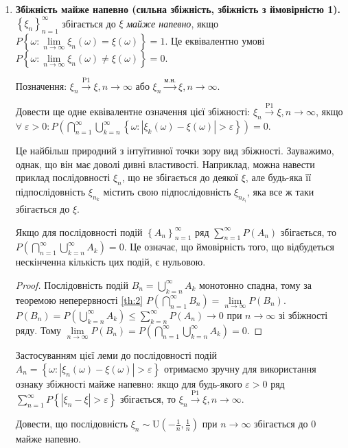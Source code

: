 \noindent\begin{enumerate}
    \item \textbf{Збіжність майже напевно (сильна збіжність, збіжність з ймовірністю 1).}
    \noindent$\left\{ \xi_n\right\}_{n=1}^{\infty}$ збігається до $\xi$ \emph{майже напевно}, якщо
    $P\left\{ \omega: \underset{n\to\infty}{\lim} \xi_n(\omega) = \xi(\omega)\right\} = 1$. 
    Це еквівалентно умові $P\left\{ \omega: \underset{n\to\infty}{\lim} \xi_n(\omega) \neq \xi(\omega)\right\} = 0$.

    Позначення: $\xi_n \overset{\mathrm{P1}}{\longrightarrow} \xi, n \to \infty$ або $\xi_n \overset{\text{м.н.}}{\longrightarrow} \xi, n \to \infty$.
    \begin{exercise}
        Довести ще одне еквівалентне означення цієї збіжності: $\xi_n \overset{\mathrm{P1}}{\longrightarrow} \xi, n \to \infty$, якщо
        $\forall \; \varepsilon > 0: P\left( \bigcap\limits_{n=1}^{\infty} \bigcup\limits_{k = n}^{\infty}
        \left\{ \omega : \left| \xi_k(\omega) - \xi(\omega)\right| > \varepsilon\right\}\right) = 0$.
    \end{exercise}

    Це найбільш природний з інтуїтивної точки зору вид збіжності. Зауважимо, однак, що він має доволі дивні властивості. Наприклад, можна навести приклад
    послідовності $\xi_n$, що не збігається до деякої $\xi$, але будь-яка її підпослідовність $\xi_{n_k}$ містить свою підпослідовність
    $\xi_{n_{k_l}}$, яка все ж таки збігається до $\xi$.
    
    \begin{proposition*}
        Якщо для послідовності подій $\left\{A_n \right\}_{n=1}^{\infty}$ ряд
    $\sum\limits_{n=1}^{\infty} P(A_n)$ збігається, то $P\left( \bigcap\limits_{n=1}^{\infty} \bigcup\limits_{k = n}^{\infty} A_k\right) = 0$.
    Це означає, що ймовірність того, що відбудеться нескінченна кількість цих подій, є нульовою.
    \end{proposition*}
    \begin{proof}
        Послідовність подій $B_n = \bigcup\limits_{k = n}^{\infty} A_k$ монотонно спадна, тому за теоремою неперервності \ref{th:2}
        $P\left( \bigcap\limits_{n=1}^{\infty} B_n\right) = \underset{n\to\infty}{\lim} P(B_n)$.
        $P(B_n) = P\left( \bigcup\limits_{k = n}^{\infty} A_k\right) \leq \sum\limits_{k=n}^{\infty}P(A_n) \to 0$ при $n\to \infty$ 
        зі збіжності ряду. Тому $\underset{n\to\infty}{\lim} P(B_n) = P\left( \bigcap\limits_{n=1}^{\infty} \bigcup\limits_{k = n}^{\infty} A_k\right) = 0$.
    \end{proof}
    Застосуванням цієї леми до послідовності подій $A_n = \left\{ \omega : \left| \xi_n(\omega) - \xi(\omega)\right| > \varepsilon\right\}$ отримаємо зручну для використання
    ознаку збіжності майже напевно: якщо для будь-якого $\varepsilon >0$ ряд
    $\sum\limits_{n=1}^{\infty} P\left\{\left| \xi_n - \xi\right| > \varepsilon\right\}$ збігається, то 
    $\xi_n \overset{\mathrm{P1}}{\longrightarrow} \xi, n \to \infty$.
    \begin{example}
        Довести, що послідовність $\xi_n \sim \mathrm{U}(-\frac{1}{n}, \frac{1}{n})$ при $n\to\infty$ збігається до 0 майже напевно.
        

\end{example}
\end{enumerate}
